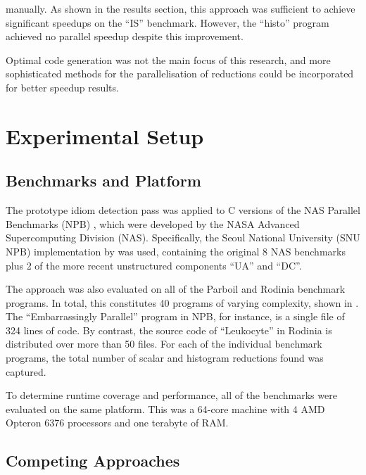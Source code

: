     \noindent
    manually.
    As shown in the results section, this approach was sufficient to achieve
    significant speedups on the ``IS'' benchmark.
    However, the ``histo'' program achieved no parallel speedup despite
    this improvement.

    Optimal code generation was not the main focus of this research, and more
    sophisticated methods for the parallelisation of reductions could be
    incorporated for better speedup results.

\section{Experimental Setup}

\subsection{Benchmarks and Platform}

    The prototype idiom detection pass was applied to C versions of the
    NAS Parallel Benchmarks (NPB) \citep{Bailey1991NPB}, which were developed
    by the NASA Advanced Supercomputing Division (NAS).
    Specifically, the Seoul National University (SNU NPB) implementation by
    \citet{seo2011performance} was used, containing the original 8 NAS
    benchmarks plus 2 of the more recent unstructured components ``UA'' and
    ``DC''.

    The approach was also evaluated on all of the Parboil \citep{Stratton2018}
    and Rodinia \citep{Che2009Rodinia} benchmark programs.
    In total, this constitutes 40 programs of varying complexity, shown in
    .
    The ``Embarrassingly Parallel'' program in NPB, for instance, is a single
    file of 324 lines of code.
    By contrast, the source code of ``Leukocyte'' in Rodinia is distributed over
    more than 50 files.
    For each of the individual benchmark programs, the total number of scalar
    and histogram reductions found was captured.

    To determine runtime coverage and performance, all of the benchmarks were
    evaluated on the same platform.
    This was a 64-core machine with 4 AMD Opteron 6376 processors and one
    terabyte of RAM.

\subsection{Competing Approaches}
\label{section:competition}

